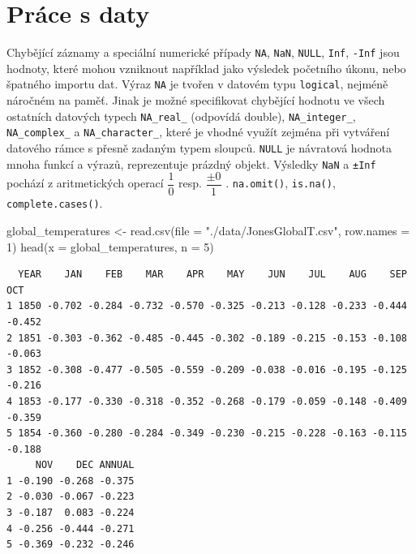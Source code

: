 \documentclass[
  letterpaper,
  DIV=11,
  numbers=noendperiod]{scrreprt}
\newenvironment{Shaded}{\begin{snugshade}}{\end{snugshade}}
\newcommand{\AttributeTok}[1]{\textcolor[rgb]{0.40,0.45,0.13}{#1}}
\newcommand{\DecValTok}[1]{\textcolor[rgb]{0.68,0.00,0.00}{#1}}
\newcommand{\FunctionTok}[1]{\textcolor[rgb]{0.28,0.35,0.67}{#1}}
\newcommand{\NormalTok}[1]{\textcolor[rgb]{0.00,0.23,0.31}{#1}}
\newcommand{\OtherTok}[1]{\textcolor[rgb]{0.00,0.23,0.31}{#1}}
\newcommand{\StringTok}[1]{\textcolor[rgb]{0.13,0.47,0.30}{#1}}
\begin{document}
\hypertarget{pruxe1ce-s-daty}{%
\section{Práce s daty}\label{pruxe1ce-s-daty}}

Chybějící záznamy a speciální numerické případy \texttt{NA},
\texttt{NaN}, \texttt{NULL}, \texttt{Inf}, \texttt{-Inf} jsou hodnoty,
které mohou vzniknout například jako výsledek početního úkonu, nebo
špatného importu dat. Výraz \texttt{NA} je tvořen v datovém typu
\texttt{logical}, nejméně náročném na paměť. Jinak je možné specifikovat
chybějící hodnotu ve všech ostatních datových typech \texttt{NA\_real\_}
(odpovídá double), \texttt{NA\_integer\_}, \texttt{NA\_complex\_} a
\texttt{NA\_character\_}, které je vhodné využít zejména při vytváření
datového rámce s přesně zadaným typem sloupců. \texttt{NULL} je
návratová hodnota mnoha funkcí a výrazů, reprezentuje prázdný objekt.
Výsledky \texttt{NaN} a \texttt{±Inf} pochází z aritmetických operací
\(\dfrac{1}{0}\) resp. \(\dfrac{\pm0}{1}\) . \texttt{na.omit()},
\texttt{is.na()}, \texttt{complete.cases()}.

\begin{Shaded}
\begin{Highlighting}[]
\NormalTok{global\_temperatures }\OtherTok{\textless{}{-}} \FunctionTok{read.csv}\NormalTok{(}\AttributeTok{file =} \StringTok{"./data/JonesGlobalT.csv"}\NormalTok{, }\AttributeTok{row.names =} \DecValTok{1}\NormalTok{)}
\FunctionTok{head}\NormalTok{(}\AttributeTok{x =}\NormalTok{ global\_temperatures, }\AttributeTok{n =} \DecValTok{5}\NormalTok{)}
\end{Highlighting}
\end{Shaded}

\begin{verbatim}
  YEAR    JAN    FEB    MAR    APR    MAY    JUN    JUL    AUG    SEP    OCT
1 1850 -0.702 -0.284 -0.732 -0.570 -0.325 -0.213 -0.128 -0.233 -0.444 -0.452
2 1851 -0.303 -0.362 -0.485 -0.445 -0.302 -0.189 -0.215 -0.153 -0.108 -0.063
3 1852 -0.308 -0.477 -0.505 -0.559 -0.209 -0.038 -0.016 -0.195 -0.125 -0.216
4 1853 -0.177 -0.330 -0.318 -0.352 -0.268 -0.179 -0.059 -0.148 -0.409 -0.359
5 1854 -0.360 -0.280 -0.284 -0.349 -0.230 -0.215 -0.228 -0.163 -0.115 -0.188
     NOV    DEC ANNUAL
1 -0.190 -0.268 -0.375
2 -0.030 -0.067 -0.223
3 -0.187  0.083 -0.224
4 -0.256 -0.444 -0.271
5 -0.369 -0.232 -0.246
\end{verbatim}
\end{document}
